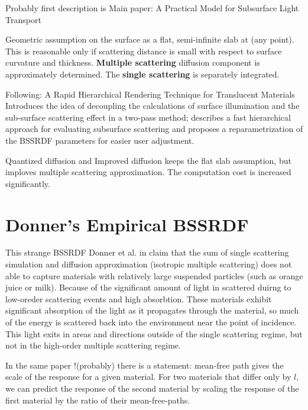 Probably first description is \cite{Stam1995}
Main paper: A Practical Model for Subsurface Light Transport \cite{Jensen:2001:PMS:383259.383319}

Geometric assumption on the surface as a flat, semi-infinite slab at (any
point). This is reasonable only if scattering distance is small with respect to
surface curvature and thickness. \textbf{Multiple scattering} diffusion
component is approximately determined. The \textbf{single scattering} is
separately integrated.

Following: A Rapid Hierarchical Rendering Technique for Translucent Materials\\
\cite{Jensen:2002:RHR:566570.566619} Introduces the idea of decoupling the calculations of surface
illumination and the sub-surface scattering effect in a two-pass method;
describes a fast hierarchical approach for evaluating subsurface scattering
and proposes a reparametrization of the BSSRDF parameters for easier user adjustment.

Quantized diffusion \cite{D'Eon:2011:QMR:1964921.1964951} and
Improved diffusion \cite{Habel:2013:PBD:2600890.2600896} keeps the flat slab
assumption, but imploves multiple scattering approximation. The computation cost
is increased significantly.

\section{Donner's Empirical BSSRDF}
This strange \gls{BSSRDF}
Donner et al. in \cite{Donner:2009:EBM} claim that the sum of single scattering
simulation and diffusion approximation (isotropic multiple scattering) does not
able to capture materials with relatively large suspended particles (such as
orange juice or milk). Because of the significant amount of light in scattered
duirng to low-oreder scattering events and high absorbtion.
These materials exhibit significant absorption of the light as it propagates
through the material, so much of the energy is scattered back into
the environment near the point of incidence. This light exits in areas and
directions outside of the single scattering regime, but not in the high-order
multiple scattering regime.

In the same paper !(probably) there is a statement:
mean-free path gives the scale of the response for a given material. For two
materials that differ only by $l$, we can predict the response of the second
material by scaling the response of the first material by the ratio of their
mean-free-paths.

